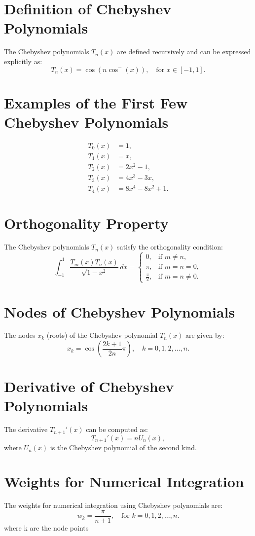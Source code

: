 \documentclass[12pt]{report} %
\begin{document}
\section{Definition of Chebyshev Polynomials}
The Chebyshev polynomials \( T_n(x) \) are defined recursively and can be expressed explicitly as:
\[
T_n(x) = \cos(n \cos^{-}(x)), \quad \text{for } x \in [-1, 1].
\]

\section{Examples of the First Few Chebyshev Polynomials}
\begin{align*}
T_0(x) &= 1, \\
T_1(x) &= x, \\
T_2(x) &= 2x^2 - 1, \\
T_3(x) &= 4x^3 - 3x, \\
T_4(x) &= 8x^4 - 8x^2 + 1.
\end{align*}

\section{Orthogonality Property}
The Chebyshev polynomials \( T_n(x) \) satisfy the orthogonality condition:
\[
\int_{-1}^{1} \frac{T_m(x) T_n(x)}{\sqrt{1-x^2}} \, dx = 
\begin{cases}
0, & \text{if } m \neq n, \\
\pi, & \text{if } m = n = 0, \\
\frac{\pi}{2}, & \text{if } m = n \neq 0.
\end{cases}
\]

\section{Nodes of Chebyshev Polynomials}
The nodes \( x_k \) (roots) of the Chebyshev polynomial \( T_n(x) \) are given by:
\[
x_k = \cos\left(\frac{2k + 1}{2n} \pi\right), \quad k = 0, 1, 2, \dots, n.
\]

\section{Derivative of Chebyshev Polynomials}
The derivative \( T_{n+1}'(x) \) can be computed as:
\[
T_{n+1}'(x) = n U_{n}(x),
\]
where \( U_{n}(x) \) is the Chebyshev polynomial of the second kind.

\section{Weights for Numerical Integration}
The weights for numerical integration using Chebyshev polynomials are:
\[
w_k = \frac{\pi}{n+1}, \quad \text{for } k = 0, 1, 2, \dots, n.
\]
where k are the node points
\end{document}
